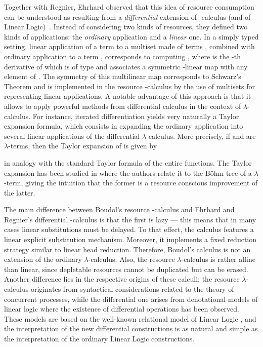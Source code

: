 \documentclass{LMCS}
\newcommand{\lam}{\ensuremath{\lambda}}
\begin{document}
Together with Regnier, Ehrhard observed that this idea of resource consumption can be
understood as resulting from a \emph{differential} extension of
-calculus (and of Linear Logic)~\cite{EhrhardR03}. 
Instead of considering two kinds of resources, they defined two kinds of applications: the \emph{ordinary} application and a \emph{linear} one.
In a simply typed setting, linear application of a term  to a multiset made of  terms
, combined with ordinary application to a term ,
corresponds to computing , where  is the
-th derivative of  which is of type  and associates a
symmetric -linear map with any element of . The symmetry of this
multilinear map corresponds to Schwarz's Theorem and
is implemented in the resource -calculus by the use of multisets for
representing linear applications. 
A notable advantage of this approach is that it allows to apply powerful methods from differential calculus in the context of \lam-calculus.
For instance, iterated differentiation yields very naturally a Taylor expansion formula, which consists in expanding the ordinary application into
several linear applications of the differential \lam-calculus. 
More precisely, if  and  are \lam-terms, then the Taylor expansion of  is given by

in analogy with the standard Taylor formula of the entire functions.
The Taylor expansion has been studied in \cite{EhrhardR08} where the authors relate it to the B\"ohm tree of a \lam-term, giving the intuition that the former is a resource conscious improvement of the latter.

The main difference between Boudol's resource -calculus and Ehrhard and Regnier's
differential -calculus is that the first is lazy --- this means that in many cases linear substitutions must be delayed. 
To that effect, the calculus features a linear explicit substitution mechanism. 
Moreover, it implements a fixed reduction strategy similar to linear head reduction.
Therefore, Boudol's calculus is not an extension of the ordinary 
\lam-calculus.
Also, the resource \lam-calculus is rather affine than linear, since depletable resources cannot be duplicated but can be erased.
Another difference lies in the respective origins of these calculi: 
the resource \lam-calculus originates from syntactical considerations related to the theory 
of concurrent processes, while the differential one arises from denotational models of linear logic where the existence of differential
operations has been observed. These models are based on the well-known relational model
of Linear Logic \cite{Girard88}, and the interpretation of the new differential constructions
is as natural and simple as the interpretation of the ordinary Linear Logic
constructions. 
\end{document}
